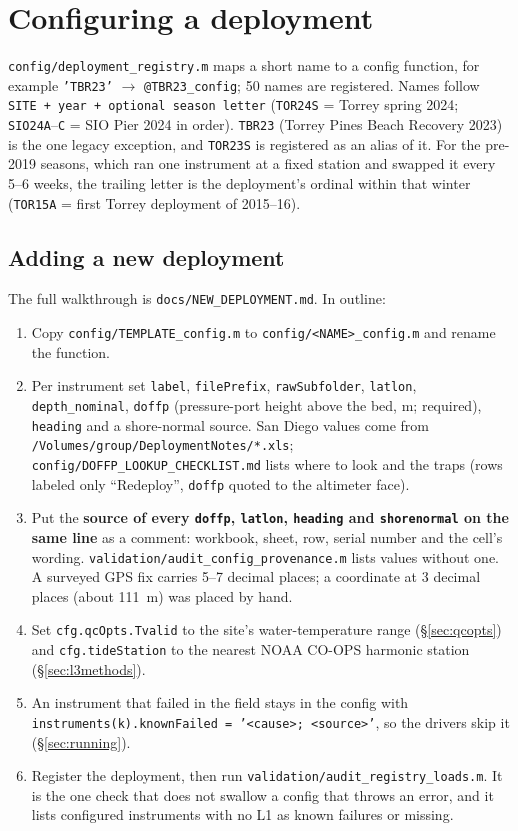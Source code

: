 \documentclass[11pt]{article}
\newcommand{\code}[1]{\texttt{#1}}
\begin{document}
\section{Configuring a deployment}
\label{sec:config}

\code{config/deployment\_registry.m} maps a short name to a config function, for example
\code{'TBR23'} $\rightarrow$ \code{@TBR23\_config}; 50 names are registered. Names follow
\code{SITE + year + optional season letter} (\code{TOR24S} = Torrey spring 2024;
\code{SIO24A}--\code{C} = SIO Pier 2024 in order). \code{TBR23} (Torrey Pines Beach Recovery
2023) is the one legacy exception, and \code{TOR23S} is registered as an alias of it. For the
pre-2019 seasons, which ran one instrument at a fixed station and swapped it every 5--6 weeks,
the trailing letter is the deployment's ordinal within that winter (\code{TOR15A} = first Torrey
deployment of 2015--16).

\subsection{Adding a new deployment}

The full walkthrough is \code{docs/NEW\_DEPLOYMENT.md}. In outline:
\begin{enumerate}
\item Copy \code{config/TEMPLATE\_config.m} to \code{config/<NAME>\_config.m} and rename the
  function.
\item Per instrument set \code{label}, \code{filePrefix}, \code{rawSubfolder}, \code{latlon},
  \code{depth\_nominal}, \code{doffp} (pressure-port height above the bed, m; required),
  \code{heading} and a shore-normal source. San Diego values come from
  \code{/Volumes/group/DeploymentNotes/*.xls}; \code{config/DOFFP\_LOOKUP\_CHECKLIST.md} lists
  where to look and the traps (rows labeled only ``Redeploy'', \code{doffp} quoted to the
  altimeter face).
\item Put the \textbf{source of every \code{doffp}, \code{latlon}, \code{heading} and
  \code{shorenormal} on the same line} as a comment: workbook, sheet, row, serial number and the
  cell's wording. \code{validation/audit\_config\_provenance.m} lists values without one. A
  surveyed GPS fix carries 5--7 decimal places; a coordinate at 3 decimal places
  (about 111~m) was placed by hand.
\item Set \code{cfg.qcOpts.Tvalid} to the site's water-temperature range (\S\ref{sec:qcopts})
  and \code{cfg.tideStation} to the nearest NOAA CO-OPS harmonic station
  (\S\ref{sec:l3methods}).
\item An instrument that failed in the field stays in the config with
  \code{instruments(k).knownFailed = '<cause>; <source>'}, so the drivers skip it
  (\S\ref{sec:running}).
\item Register the deployment, then run \code{validation/audit\_registry\_loads.m}. It is the
  one check that does not swallow a config that throws an error, and it lists configured
  instruments with no L1 as known failures or missing.
\end{enumerate}
\end{document}

